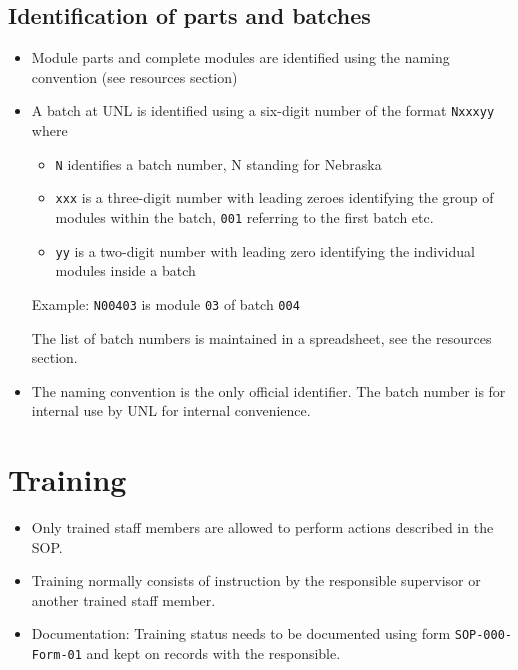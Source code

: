 \documentclass[12pt]{unlsilabsop}
\begin{document}
\subsection{Identification of parts and batches}
\begin{itemize}
    \item Module parts and complete modules are identified using the naming convention (see resources section)
    \item A batch at UNL is identified using a six-digit number of the format \texttt{Nxxxyy} where
    \begin{itemize}
	\item \texttt{N} identifies a batch number, N standing for Nebraska
	\item \texttt{xxx} is a three-digit number with leading zeroes identifying the group of modules within the batch, \texttt{001} referring to the first batch etc.
	\item \texttt{yy} is a two-digit number with leading zero identifying the individual modules inside a batch
    \end{itemize}
    Example: \texttt{N00403} is module \texttt{03} of batch \texttt{004}

    The list of batch numbers is maintained in a spreadsheet, see the resources section.
    \item The naming convention is the only official identifier. The batch number is for internal use by UNL for internal convenience.
\end{itemize}

\section{Training}
\begin{itemize}
\item Only trained staff members are allowed to perform actions described in the SOP.
\item Training normally consists of instruction by the responsible supervisor or another trained staff member.
\item Documentation: Training status needs to be documented using form \texttt{SOP-000-Form-01} and kept on records with the responsible.
\end{itemize}

\end{document}
